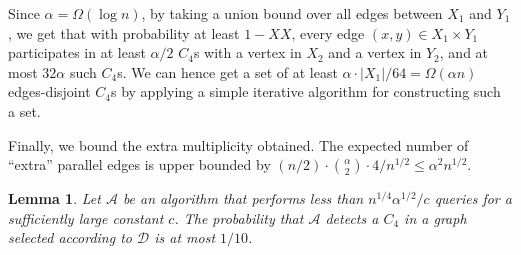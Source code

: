 \documentclass{article}
\newcommand{\calA}{{\mathcal{A}}}
\newcommand{\calD}{{\mathcal{D}}}
\newtheorem{lemma}{Lemma}
\newcommand{\commentt}[1]{ {}}
\begin{document}
Since $\alpha = \Omega(\log n)$, by taking a union bound over all edges between $X_1$ and $Y_1$, we get that
with probability at least $1-XX$, every edge $(x,y)\in X_1\times Y_1$ participates in at least $\alpha/2$ $C_4$s with a vertex in $X_2$ and a vertex in $Y_2$, and at most $32\alpha$ such $C_4$s. We can hence get a set of at least $\alpha\cdot |X_1|/64 = \Omega(\alpha n)$ edges-disjoint $C_4$s by applying a simple iterative algorithm for constructing such a set. \commentt{DR: explain more/better?}

Finally, we  bound the extra multiplicity obtained.
The expected number of ``extra'' parallel edges is upper bounded by
$(n/2)\cdot {\alpha\choose 2} \cdot 4/ n^{1/2} \leq \alpha^2 n^{1/2}$. \commentt{TO BE finalized after setting parameters more precisely or maybe just upper bounding $\alpha$}
\fi

\begin{lemma}\label{lem:D-C4-lb}
Let $\calA$ be an algorithm  that performs less than $n^{1/4}\alpha^{1/2}/c$ queries for a sufficiently large constant $c$. The probability that $\calA$ detects a $C_4$ in a graph selected according to $\calD$
is at most $1/10$.
\end{lemma}
\end{document}
